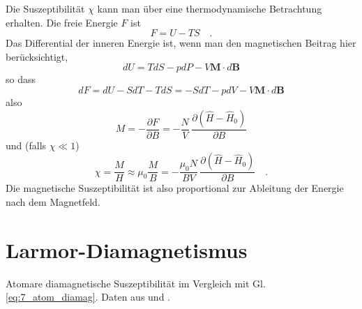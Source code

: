 Die Suszeptibilität $\chi$ kann man über eine thermodynamische Betrachtung erhalten. Die freie Energie $F$ ist
\begin{equation}
    F = U - T S \quad .
\end{equation}
Das Differential der inneren Energie ist, wenn man den magnetischen Beitrag hier berücksichtigt,
\begin{equation}
    dU = T dS - p dP - V \bm{M}\cdot d \bm{B}
\end{equation}
so dass
\begin{equation}
    dF = dU - S dT - T dS = -S dT - p dV - V \bm{M}\cdot d \bm{B}
\end{equation}
also 
\begin{equation}
    M  = - \frac{\partial F}{\partial B} = - \frac{N}{V} \, \frac{\partial (\hat{H} - \hat{H}_0)}{\partial B}
\end{equation}
und (falls $\chi \ll 1$)
\begin{equation}
    \chi = \frac{M}{H} \approx \mu_0 \frac{M}{B} = - \frac{\mu_0 N}{B V} \, \frac{\partial (\hat{H} - \hat{H}_0)}{\partial B} \quad .
\end{equation}
Die magnetische Suszeptibilität ist also proportional zur Ableitung der Energie nach dem Magnetfeld. 

\section*{Larmor-Diamagnetismus}


\begin{marginfigure}
    \caption{Atomare diamagnetische Suszeptibilität im Vergleich mit Gl. \ref{eq:7_atom_diamag}. Daten aus \cite{Gross_FK} und \cite{Blundell_magnetism}.
    }
\end{marginfigure}
    

